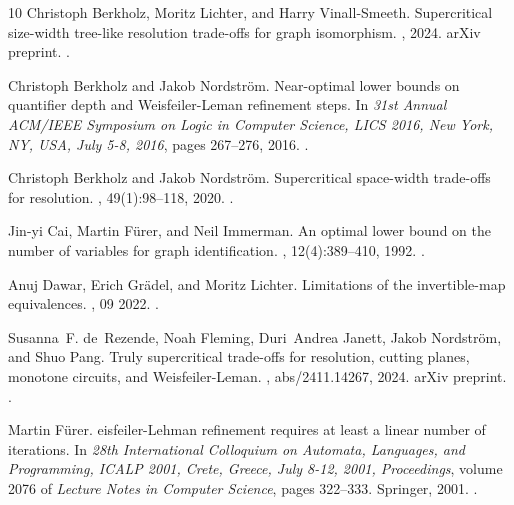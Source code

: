 \documentclass[10pt,a4paper]{article}
\begin{document}
\begin{thebibliography}{10}
Christoph Berkholz, Moritz Lichter, and Harry Vinall{-}Smeeth.
\newblock Supercritical size-width tree-like resolution trade-offs for graph
  isomorphism.
, 2024.
\newblock arXiv preprint.
\newblock \href {https://doi.org/10.48550/ARXIV.2407.17947}
  {}.

Christoph Berkholz and Jakob Nordstr{\"{o}}m.
\newblock Near-optimal lower bounds on quantifier depth and
  {W}eisfeiler-{L}eman refinement steps.
\newblock In {\em 31st Annual {ACM/IEEE} Symposium on Logic in Computer
  Science, {LICS} 2016, New York, NY, USA, July 5-8, 2016}, pages 267--276,
  2016.
\newblock \href {https://doi.org/10.1145/2933575.2934560}
  {}.

Christoph Berkholz and Jakob Nordstr{\"{o}}m.
\newblock Supercritical space-width trade-offs for resolution.
, 49(1):98--118, 2020.
\newblock \href {https://doi.org/10.1137/16M1109072}
  {}.

Jin{-}yi Cai, Martin F{\"{u}}rer, and Neil Immerman.
\newblock An optimal lower bound on the number of variables for graph
  identification.
, 12(4):389--410, 1992.
\newblock \href {https://doi.org/10.1007/BF01305232}
  {}.

Anuj Dawar, Erich Grädel, and Moritz Lichter.
\newblock Limitations of the invertible-map equivalences.
, 09 2022.
\newblock \href {https://doi.org/10.1093/logcom/exac058}
  {}.

Susanna~F. de~Rezende, Noah Fleming, Duri~Andrea Janett, Jakob Nordstr{\"{o}}m,
  and Shuo Pang.
\newblock Truly supercritical trade-offs for resolution, cutting planes,
  monotone circuits, and {W}eisfeiler-{L}eman.
, abs/2411.14267, 2024.
\newblock arXiv preprint.
\newblock \href {https://doi.org/10.48550/ARXIV.2411.14267}
  {}.

Martin F{\"{u}}rer.
eisfeiler-{L}ehman refinement requires at least a linear number of
  iterations.
\newblock In {\em 28th International Colloquium on Automata, Languages, and
  Programming, {ICALP} 2001, Crete, Greece, July 8-12, 2001, Proceedings},
  volume 2076 of {\em Lecture Notes in Computer Science}, pages 322--333.
  Springer, 2001.
\newblock \href {https://doi.org/10.1007/3-540-48224-5\_27}
  {}.


\end{thebibliography}
\end{document}
